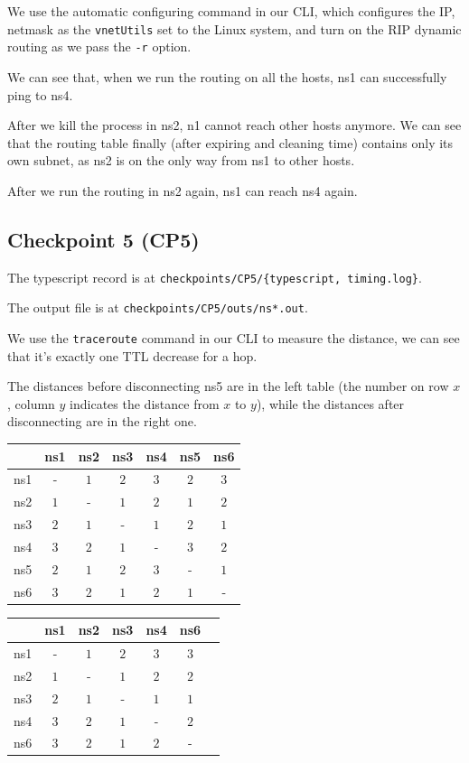 \documentclass[a4paper]{article}
\begin{document}
  We use the automatic configuring command in our CLI, which configures the IP, netmask as the \texttt{vnetUtils} set to the Linux system, and turn on the RIP dynamic routing as we pass the \texttt{-r} option.

  We can see that, when we run the routing on all the hosts, ns1 can successfully ping to ns4.

  After we kill the process in ns2, n1 cannot reach other hosts anymore. We can see that the routing table finally (after expiring and cleaning time) contains only its own subnet, as ns2 is on the only way from ns1 to other hosts.

  After we run the routing in ns2 again, ns1 can reach ns4 again.

  \subsection{Checkpoint 5 (CP5)}

  The typescript record is at \texttt{checkpoints/CP5/\{typescript, timing.log\}}.

  The output file is at \texttt{checkpoints/CP5/outs/ns*.out}.

  We use the \texttt{traceroute} command in our CLI to measure the distance, we can see that it's exactly one TTL decrease for a hop.

  The distances before disconnecting ns5 are in the left table (the number on row $x$, column $y$ indicates the distance from $x$ to $y$), while the distances after disconnecting are in the right one.

  \begin{center}
    \begin{tabular}{c|cccccc}
      \toprule
      & ns1 & ns2 & ns3 & ns4 & ns5 & ns6 \\
      \midrule
      ns1 & - & $1$ & $2$ & $3$ & $2$ & $3$ \\
      ns2 & $1$ & - & $1$ & $2$ & $1$ & $2$ \\
      ns3 & $2$ & $1$ & - & $1$ & $2$ & $1$ \\
      ns4 & $3$ & $2$ & $1$ & - & $3$ & $2$ \\
      ns5 & $2$ & $1$ & $2$ & $3$ & - & $1$ \\
      ns6 & $3$ & $2$ & $1$ & $2$ & $1$ & - \\
      \bottomrule
    \end{tabular}
    \hspace{2em}
    \begin{tabular}{c|cccccc}
      \toprule
      & ns1 & ns2 & ns3 & ns4 & ns6 \\
      \midrule
      ns1 & - & $1$ & $2$ & $3$ & $3$ \\
      ns2 & $1$ & - & $1$ & $2$ & $2$ \\
      ns3 & $2$ & $1$ & - & $1$ & $1$ \\
      ns4 & $3$ & $2$ & $1$ & - & $2$ \\
      ns6 & $3$ & $2$ & $1$ & $2$ & - \\
      \bottomrule
    \end{tabular}
  \end{center}
\end{document}
